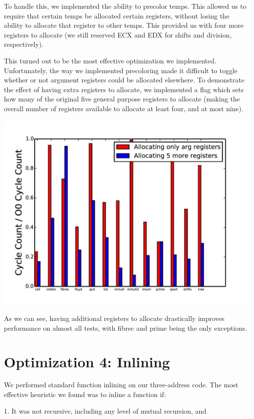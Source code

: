 \documentclass{article}
\begin{document}
To handle this, we implemented the ability to precolor temps. This allowed us to require that certain temps be allocated certain registers, without losing the ability to allocate that register to other temps. This provided us with four more registers to allocate (we still reserved ECX and EDX for shifts and division, respectively). 

This turned out to be the most effective optimization we implemented. Unfortunately, the way we implemented precoloring made it difficult to toggle whether or not argument registers could be allocated elsewhere. To demonstrate the effect of having extra registers to allocate, we implemented a flag which sets how many of the original five general purpose registers to allocate (making the overall number of registers available to allocate at least four, and at most nine).

\includegraphics[scale=0.5]{allocating_more_regs-page-001}

As we can see, having additional registers to allocate drastically improves performance on almost all tests, with fibrec and prime being the only exceptions.

\section{Optimization 4: Inlining}

We performed standard function inlining on our three-address code. The most effective heuristic we found was to inline a function if:

1. It was not recursive, including any level of mutual recursion, and
\end{document}
